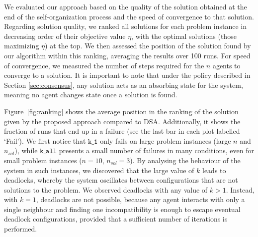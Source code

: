 
We evaluated our approach based on the quality of the solution obtained at the end of the self-organization process and the speed of convergence to that solution. Regarding solution quality, we ranked all solutions for each problem instance in decreasing order of their objective value $\eta$, with the optimal solutions (those maximizing $\eta$) at the top. We then assessed the position of the solution found by our algorithm within this ranking, averaging the results over 100 runs. For speed of convergence, we measured the number of steps required for the $n$ agents to converge to a solution. It is important to note that under the policy described in Section \ref{sec:consensus}, any solution acts as an absorbing state for the system, meaning no agent changes state once a solution is found.

Figure~\ref{fig:ranking} shows the average position in the ranking of the solution given by the proposed approach compared to DSA. Additionally, it shows the fraction of runs that end up in a failure (see the last bar in each plot labelled `Fail'). We first notice that $\texttt{k\_1}$ only fails on large problem instances (large $n$ and $n_{sol}$), while $\texttt{k\_all}$ presents a small number of failures in many conditions, even for small problem instances ($n=10$, $n_{sol}=3$).
By analysing the behaviour of the system in such instances, we discovered that the large value of $k$ leads to deadlocks, whereby the system oscillates between configurations that are not solutions to the problem.
We observed deadlocks with any value of $k>1$. Instead, with $k=1$, deadlocks are not possible, because any agent interacts with only a single neighbour and finding one incompatibility is enough to escape eventual deadlock configurations, provided that a sufficient number of iterations is performed.

